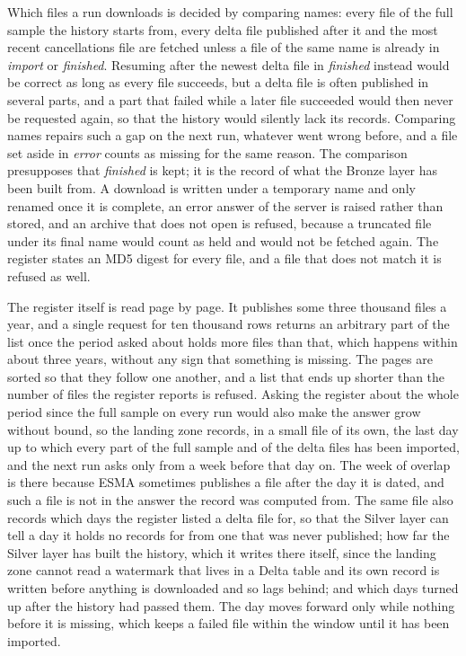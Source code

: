 Which files a run downloads is decided by comparing names: every file of the full sample the history starts from, every delta file published after it and the most recent cancellations file are fetched unless a file of the same name is already in \emph{import} or \emph{finished}. Resuming after the newest delta file in \emph{finished} instead would be correct as long as every file succeeds, but a delta file is often published in several parts, and a part that failed while a later file succeeded would then never be requested again, so that the history would silently lack its records. Comparing names repairs such a gap on the next run, whatever went wrong before, and a file set aside in \emph{error} counts as missing for the same reason. The comparison presupposes that \emph{finished} is kept; it is the record of what the Bronze layer has been built from. A download is written under a temporary name and only renamed once it is complete, an error answer of the server is raised rather than stored, and an archive that does not open is refused, because a truncated file under its final name would count as held and would not be fetched again. The register states an MD5 digest for every file, and a file that does not match it is refused as well.

The register itself is read page by page. It publishes some three thousand files a year, and a single request for ten thousand rows returns an arbitrary part of the list once the period asked about holds more files than that, which happens within about three years, without any sign that something is missing. The pages are sorted so that they follow one another, and a list that ends up shorter than the number of files the register reports is refused. Asking the register about the whole period since the full sample on every run would also make the answer grow without bound, so the landing zone records, in a small file of its own, the last day up to which every part of the full sample and of the delta files has been imported, and the next run asks only from a week before that day on. The week of overlap is there because ESMA sometimes publishes a file after the day it is dated, and such a file is not in the answer the record was computed from. The same file also records which days the register listed a delta file for, so that the Silver layer can tell a day it holds no records for from one that was never published; how far the Silver layer has built the history, which it writes there itself, since the landing zone cannot read a watermark that lives in a Delta table and its own record is written before anything is downloaded and so lags behind; and which days turned up after the history had passed them. The day moves forward only while nothing before it is missing, which keeps a failed file within the window until it has been imported.

